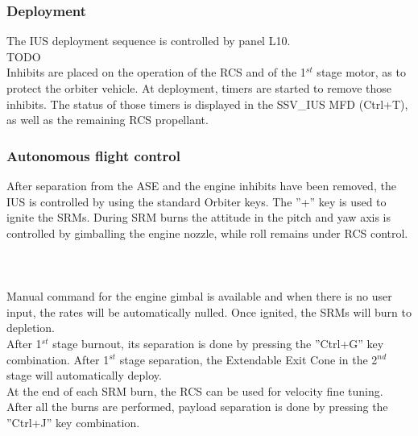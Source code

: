 \documentclass[Space_Shuttle_Vessel_Manual.tex]{subfiles}
\begin{document}
\begin{multicols*}{2}
\subsubsection{Deployment}
The IUS deployment sequence is controlled by panel L10.
\\
TODO
\\
Inhibits are placed on the operation of the RCS and of the 1$^{st}$ stage motor, as to protect the orbiter vehicle. At deployment, timers are started to remove those inhibits. The status of those timers is displayed in the SSV\_IUS MFD (Ctrl+T), as well as the remaining RCS propellant.

\subsubsection{Autonomous flight control}
After separation from the ASE and the engine inhibits have been removed, the IUS is controlled by using the standard Orbiter keys. The ''+'' key is used to ignite the SRMs. During SRM burns the attitude in the pitch and yaw axis is controlled by gimballing the engine nozzle, while roll remains under RCS control.
\\
\\
\\
\\
Manual command for the engine gimbal is available and when there is no user input, the rates will be automatically nulled. Once ignited, the SRMs will burn to depletion.\\
After 1$^{st}$ stage burnout, its separation is done by pressing the ''Ctrl+G'' key combination. After 1$^{st}$ stage separation, the Extendable Exit Cone in the 2$^{nd}$ stage will automatically deploy.\\
At the end of each SRM burn, the RCS can be used for velocity fine tuning.\\
After all the burns are performed, payload separation is done by pressing the ''Ctrl+J'' key combination.


\end{multicols*}
\end{document}
